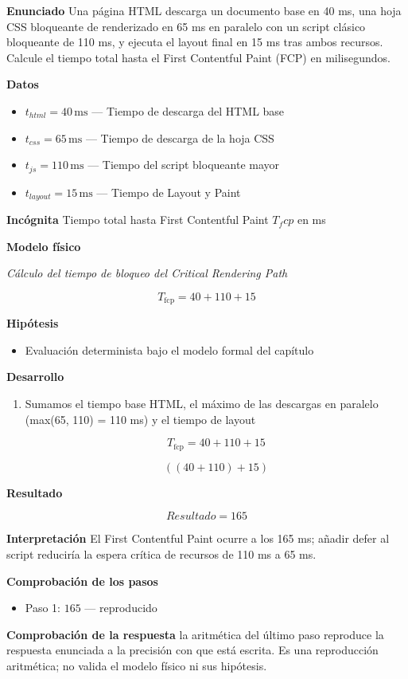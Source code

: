 \documentclass{book}
\begin{document}
\begin{tcolorbox}[title={Problema resuelto}, studiumworked, breakable]

\noindent\textbf{Enunciado}
Una página HTML descarga un documento base en 40 ms, una hoja CSS bloqueante de renderizado en 65 ms en paralelo con un script clásico bloqueante de 110 ms, y ejecuta el layout final en 15 ms tras ambos recursos. Calcule el tiempo total hasta el First Contentful Paint (FCP) en milisegundos.

\noindent\textbf{Datos}
\begin{itemize}
\item $t_{html} = 40\,\mathrm{ms}$ — Tiempo de descarga del HTML base
\item $t_{css} = 65\,\mathrm{ms}$ — Tiempo de descarga de la hoja CSS
\item $t_{js} = 110\,\mathrm{ms}$ — Tiempo del script bloqueante mayor
\item $t_{layout} = 15\,\mathrm{ms}$ — Tiempo de Layout y Paint
\end{itemize}

\noindent\textbf{Incógnita}
Tiempo total hasta First Contentful Paint \(T_fcp\) en ms

\noindent\textbf{Modelo físico}

\noindent\textit{Cálculo del tiempo de bloqueo del Critical Rendering Path}

\[
T_{\text{fcp}} = 40 + 110 + 15
\]

\noindent\textbf{Hipótesis}
\begin{itemize}
\item Evaluación determinista bajo el modelo formal del capítulo
\end{itemize}

\noindent\textbf{Desarrollo}
\begin{enumerate}
\item
Sumamos el tiempo base HTML, el máximo de las descargas en paralelo (max(65, 110) = 110 ms) y el tiempo de layout

\[
T_{\text{fcp}} = 40 + 110 + 15
\]

\[
\left(\left(40+110\right)+15\right)
\]
\end{enumerate}

\noindent\textbf{Resultado}

\[
Resultado = 165
\]

\noindent\textbf{Interpretación}
El First Contentful Paint ocurre a los 165 ms; añadir defer al script reduciría la espera crítica de recursos de 110 ms a 65 ms.

\noindent\textbf{Comprobación de los pasos}
\begin{itemize}
\item Paso 1: $165$ — reproducido
\end{itemize}

\noindent\textbf{Comprobación de la respuesta} la aritmética del último paso reproduce la respuesta enunciada a la precisión con que está escrita. Es una reproducción aritmética; no valida el modelo físico ni sus hipótesis.
\end{tcolorbox}
\end{document}
